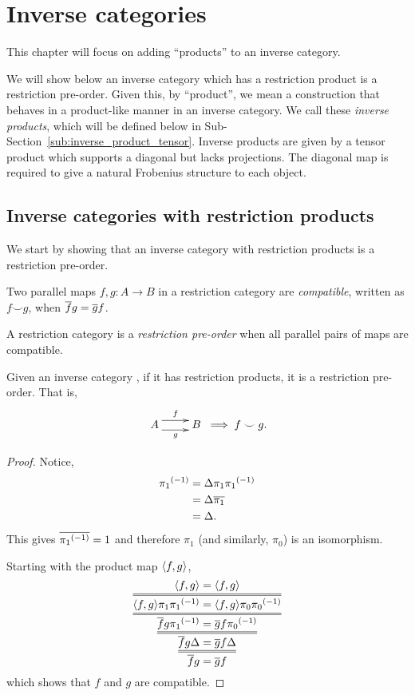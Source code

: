 \chapter{Inverse categories} %
\label{cha:inverse_categories}

This chapter will focus on adding ``products'' to an inverse category.

We will show below an inverse category which has a
restriction product is a restriction pre-order. Given this, by ``product'', we mean a construction
that behaves in a product-like manner in an inverse category. We call these \emph{inverse products}, which
will be defined below in Sub-Section~\ref{sub:inverse_product_tensor}.
Inverse products are given by a tensor product which supports a diagonal but lacks projections. The
diagonal map is required to give a natural Frobenius structure to each object.

\section{Inverse categories with restriction products} %
\label{sec:inverse_categories_with_restriction_products}
We start by showing that an inverse category with restriction products is a restriction pre-order.

\begin{definition}\label{def:compatible_maps}
  Two parallel maps $f,g:A \to B$ in a restriction category are \emph{compatible}, written as $f
  \smile g$, when $\overline{f} g = \overline{g} f$.
\end{definition}
\begin{definition}\label{def:restrictionpreorder}
  A restriction category \X is a \emph{restriction pre-order} when all parallel pairs of maps are
  compatible.
\end{definition}
\begin{proposition}\label{prop:an_inverse_category_with_products_is_a_restriction_preorder}
  Given an inverse category \X, if it has restriction products, it is a restriction pre-order. That
  is,
  \[
    \xymatrix {
      A  \ar@<1ex>[r]^{f} \ar@<-1ex>[r]_{g} &B
    }
    \implies f \smile g.
  \]
\end{proposition}
\begin{proof}
  Notice,
  \begin{align*}
    {\pi_1}^{(-1)} & = \Delta \pi_1 {\pi_1}^{(-1)}\\
    &=\Delta \overline{\pi_1}\\
    &=\Delta.
  \end{align*}
  This gives $\overline{{\pi_1}^{(-1)}} = 1$ and therefore $\pi_1$ (and similarly, $\pi_0$) is an
  isomorphism.

  Starting with the product map $\langle f,g\rangle$,
  \[
    \infer={\restr{f}g = \restr{g}f}
    {\infer={\restr{f}g\Delta = \restr{g}f\Delta}
    {\infer={\restr{f}g\inv{\pi_1} = \restr{g}f\inv{\pi_0}}
    {\infer={\<f,g\>\pi_1 \inv{\pi_1} = \<f,g\>\pi_0 \inv{\pi_0}}
    {\<f,g\> = \<f,g\>}}}}
  \]
  which shows that $f$ and $g$ are compatible.
\end{proof}

